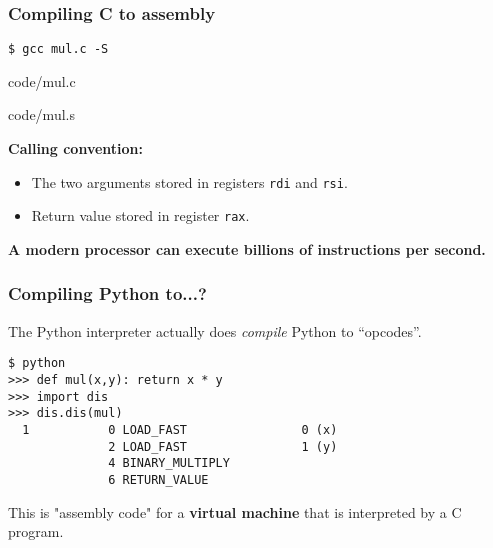 \documentclass[rgb,dvipsnames,aspectratio=169,xcolor=table]{beamer}
\begin{document}
\begin{frame}[fragile]
  \frametitle{Compiling C to assembly}

\texttt{\$ gcc mul.c -S}

  \begin{minipage}[t]{0.45\linewidth}

{code/mul.c}
  \end{minipage}
\hfill
  \begin{minipage}[t]{0.49\linewidth}
  
{code/mul.s}
  \end{minipage}

\textbf{Calling convention:}
  \begin{itemize}
  \item The two arguments stored in registers \texttt{rdi} and \texttt{rsi}.
  \item Return value stored in register \texttt{rax}.
  \end{itemize}

  \begin{center}
    \textbf{A modern processor can execute billions of instructions per second.}
  \end{center}

\end{frame}

\begin{frame}[fragile]
  \frametitle{Compiling Python to...?}

  The Python interpreter actually does \textit{compile} Python to
  ``opcodes''.

\begin{verbatim}
$ python
>>> def mul(x,y): return x * y
>>> import dis
>>> dis.dis(mul)
  1           0 LOAD_FAST                0 (x)
              2 LOAD_FAST                1 (y)
              4 BINARY_MULTIPLY
              6 RETURN_VALUE
\end{verbatim}

  This is "assembly code" for a \textbf{virtual machine} that is
  interpreted by a C program.

\end{frame}
\end{document}
